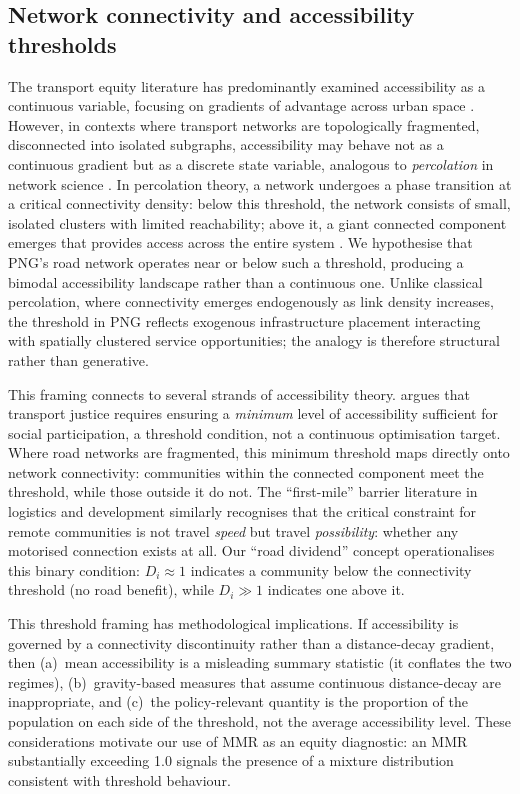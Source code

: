 \documentclass[review,3p,authoryear]{elsarticle}
\begin{document}
\subsection{Network connectivity and accessibility thresholds}

The transport equity literature has predominantly examined accessibility as a continuous variable, focusing on gradients of advantage across urban space \citep{pereira2019, delbosc2011}. However, in contexts where transport networks are topologically fragmented, disconnected into isolated subgraphs, accessibility may behave not as a continuous gradient but as a discrete state variable, analogous to \textit{percolation} in network science \citep{li2015percolation, ducruet2014}. In percolation theory, a network undergoes a phase transition at a critical connectivity density: below this threshold, the network consists of small, isolated clusters with limited reachability; above it, a giant connected component emerges that provides access across the entire system \citep{Shante01051971}. We hypothesise that PNG's road network operates near or below such a threshold, producing a bimodal accessibility landscape rather than a continuous one. Unlike classical percolation, where connectivity emerges endogenously as link density increases, the threshold in PNG reflects exogenous infrastructure placement interacting with spatially clustered service opportunities; the analogy is therefore structural rather than generative.

This framing connects to several strands of accessibility theory. \citet{martens2016} argues that transport justice requires ensuring a \textit{minimum} level of accessibility sufficient for social participation, a threshold condition, not a continuous optimisation target. Where road networks are fragmented, this minimum threshold maps directly onto network connectivity: communities within the connected component meet the threshold, while those outside it do not. The ``first-mile'' barrier literature in logistics and development \citep{starkey2002, Airey2014} similarly recognises that the critical constraint for remote communities is not travel \textit{speed} but travel \textit{possibility}: whether any motorised connection exists at all. Our ``road dividend'' concept operationalises this binary condition: $D_i \approx 1$ indicates a community below the connectivity threshold (no road benefit), while $D_i \gg 1$ indicates one above it.

This threshold framing has methodological implications. If accessibility is governed by a connectivity discontinuity rather than a distance-decay gradient, then (a)~mean accessibility is a misleading summary statistic (it conflates the two regimes), (b)~gravity-based measures that assume continuous distance-decay are inappropriate, and (c)~the policy-relevant quantity is the proportion of the population on each side of the threshold, not the average accessibility level. These considerations motivate our use of MMR as an equity diagnostic: an MMR substantially exceeding 1.0 signals the presence of a mixture distribution consistent with threshold behaviour.
\end{document}
